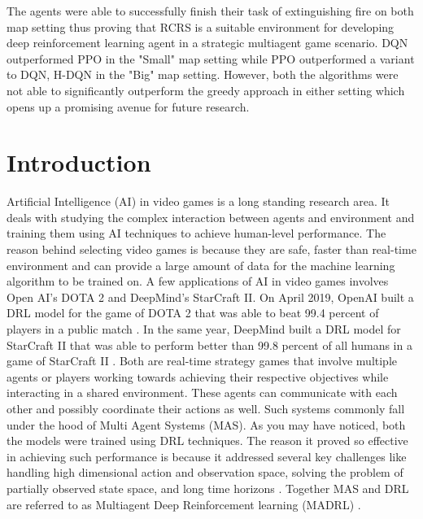 \documentclass[12pt]{report}
\begin{document}
\begin{thesisabstract}
The agents were able to successfully finish their task of extinguishing fire on both map setting thus proving that RCRS is a suitable environment for developing deep reinforcement learning agent in a strategic multiagent game scenario. DQN outperformed PPO in the "Small" map setting while PPO outperformed a variant to DQN, H-DQN in the "Big" map setting. However, both the algorithms were not able to significantly outperform the greedy approach in either setting which opens up a promising avenue for future research. 
                                
\end{thesisabstract}                 

\tableofcontents                     

\newpage

%
\listoffigures
\newpage
{}%
\listofalgorithms
\newpage
{}%
\listoftables
\newpage

\chapter{Introduction}            

Artificial Intelligence (AI) in video games is a long standing research area. It deals with studying the complex interaction between agents and environment and training them using AI techniques to achieve human-level performance. The reason behind selecting video games is because they are safe, faster than real-time environment and can provide a large amount of data for the machine learning algorithm to be trained on. A few applications of AI in video games involves Open AI's DOTA 2 and DeepMind's StarCraft II. On April 2019, OpenAI built a DRL model for the game of DOTA 2 that was able to beat 99.4 percent of players in a public match \cite{dota2}. In the same year, DeepMind built a DRL model for StarCraft II that was able to perform better than 99.8 percent of all humans in a game of StarCraft II \cite{Starcraft2}. Both are real-time strategy games that involve multiple agents or players working towards achieving their respective objectives while interacting in a shared environment. These agents can communicate with each other and possibly coordinate their actions as well. Such systems commonly fall under the hood of Multi Agent Systems (MAS). As you may have noticed, both the models were trained using DRL techniques. The reason it proved so effective in achieving such performance is because it addressed several key challenges like handling high dimensional action and observation space, solving the problem of partially observed state space, and long time horizons \cite{dota2}. Together MAS and DRL are referred to as Multiagent Deep Reinforcement learning (MADRL) \cite{Shao}. 
\end{document}
